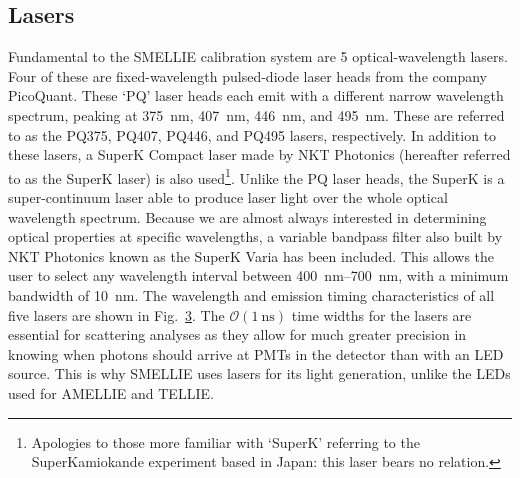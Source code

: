 \subsection{Lasers}\label{sec:smellie_lasers}
Fundamental to the SMELLIE calibration system are 5 optical-wavelength lasers. Four of these are fixed-wavelength pulsed-diode laser heads from the company PicoQuant. These `PQ' laser heads each emit with a different narrow wavelength spectrum, peaking at \SI{375}{\nm}, \SI{407}{\nm}, \SI{446}{\nm}, and \SI{495}{\nm}. These are referred to as the PQ375, PQ407, PQ446, and PQ495 lasers, respectively. In addition to these lasers, a SuperK Compact laser made by NKT Photonics (hereafter referred to as the SuperK laser) is also used\footnote{
    Apologies to those more familiar with `SuperK' referring to the SuperKamiokande experiment based in Japan: this laser bears no relation.
}. Unlike the PQ laser heads, the SuperK is a super-continuum laser able to produce laser light over the whole optical wavelength spectrum. Because we are almost always interested in determining optical properties at specific wavelengths, a variable bandpass filter also built by NKT Photonics known as the SuperK Varia has been included. This allows the user to select any wavelength interval between \SIrange{400}{700}{\nm}, with a minimum bandwidth of \SI{10}{\nm}. The wavelength and emission timing characteristics of all five lasers are shown in Fig.~\ref{fig:smellie_emission_wav_timing}. The $\mathcal{O}(\SI{1}{\ns})$ time widths for the lasers are essential for scattering analyses as they allow for much greater precision in knowing when photons should arrive at PMTs in the detector than with an LED source. This is why SMELLIE uses lasers for its light generation, unlike the LEDs used for AMELLIE and TELLIE.

\begin{figure}
    \centering
    \begin{subfigure}{0.98\textwidth}
        \centering
        \caption{}
        \label{fig:smellie_emission_wavelengths}
    \end{subfigure}
    \begin{subfigure}{0.98\textwidth}
        \centering
        \caption{}
        \label{fig:smellie_emission_timing}
    \end{subfigure}
    \caption{}
    \label{fig:smellie_emission_wav_timing}
\end{figure}

